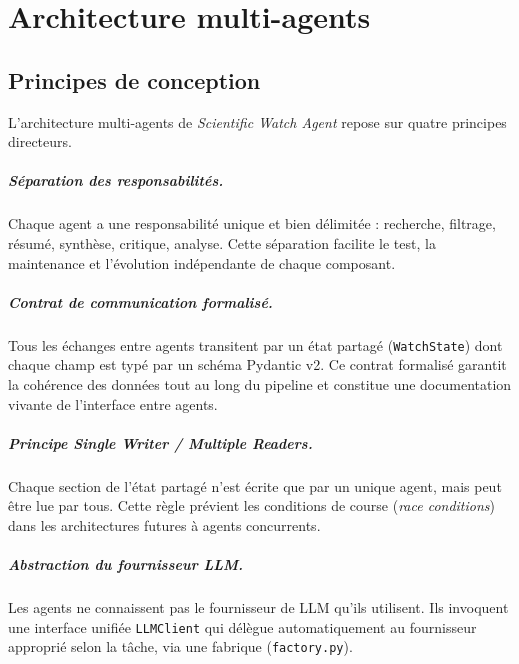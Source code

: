 \chapter{Architecture multi-agents}
\label{ch:agents}

\section{Principes de conception}

L'architecture multi-agents de \textit{Scientific Watch Agent} repose sur
quatre principes directeurs.

\paragraph{Séparation des responsabilités.}
Chaque agent a une responsabilité unique et bien délimitée : recherche,
filtrage, résumé, synthèse, critique, analyse. Cette séparation facilite
le test, la maintenance et l'évolution indépendante de chaque composant.

\paragraph{Contrat de communication formalisé.}
Tous les échanges entre agents transitent par un état partagé (\texttt{WatchState})
dont chaque champ est typé par un schéma Pydantic v2. Ce contrat formalisé
garantit la cohérence des données tout au long du pipeline et constitue
une documentation vivante de l'interface entre agents.

\paragraph{Principe Single Writer / Multiple Readers.}
Chaque section de l'état partagé n'est écrite que par un unique agent,
mais peut être lue par tous. Cette règle prévient les conditions de course
(\textit{race conditions}) dans les architectures futures à agents concurrents.

\paragraph{Abstraction du fournisseur LLM.}
Les agents ne connaissent pas le fournisseur de LLM qu'ils utilisent.
Ils invoquent une interface unifiée \texttt{LLMClient} qui délègue
automatiquement au fournisseur approprié selon la tâche, via une fabrique
(\texttt{factory.py}).

